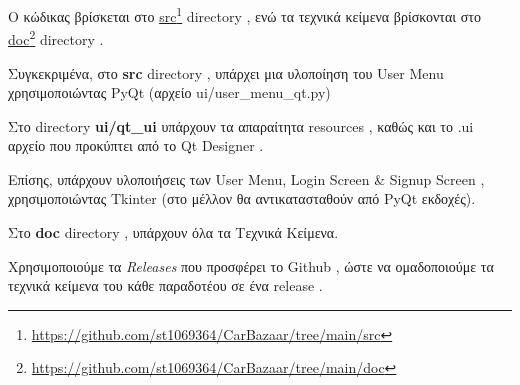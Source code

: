 \documentclass{../ol-softwaremanual}
\newcommand{\doclink}[2]{\href{#1}{#2}\footnote{\url{#1}}}
\begin{document}
	
	Ο κώδικας βρίσκεται στο \en \doclink{https://github.com/st1069364/CarBazaar/tree/main/src}{src} directory \gr, ενώ τα τεχνικά κείμενα βρίσκονται στο \en \doclink{https://github.com/st1069364/CarBazaar/tree/main/doc}{doc} directory \gr .\break
	
	Συγκεκριμένα, στο \en \textbf{src} directory \gr, υπάρχει μια υλοποίηση του \en User Menu \gr χρησιμοποιώντας \en PyQt \gr (αρχείο \en ui/user\_menu\_qt.py) \gr \break 
	
	Στο \en directory \textbf{ui/qt\_ui} \gr υπάρχουν τα απαραίτητα \en resources \gr, καθώς και το \en .ui \gr αρχείο που προκύπτει από το \en Qt Designer \gr. \break
	
	Επίσης, υπάρχουν υλοποιήσεις των \en User Menu, Login Screen \& Signup Screen \gr, χρησιμοποιώντας \en Tkinter \gr (στο μέλλον θα αντικατασταθούν από \en PyQt \gr εκδοχές). \break
	
	Στο \en \textbf{doc} directory \gr, υπάρχουν όλα τα Τεχνικά Κείμενα. \break
	
	Χρησιμοποιούμε τα \en \textit{Releases} \gr που προσφέρει το \en Github \gr, ώστε να ομαδοποιούμε τα τεχνικά κείμενα του κάθε παραδοτέου σε ένα \en release \gr .
	
	

	

	
	
	
	
	
\end{document}
